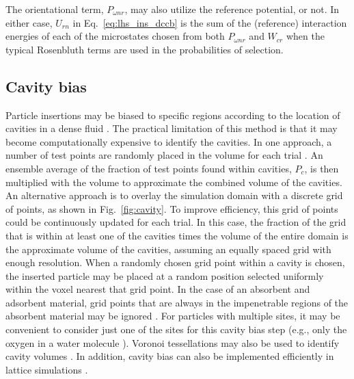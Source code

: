 \documentclass[
  9pt,
  bestpractices,
]{livecoms}
\begin{document}
The orientational term, $P_{\omega nr}$, may also utilize the reference potential, or not.
In either case, $U_{rn}$ in Eq.~\ref{eq:lhs_ins_dccb} is the sum of the (reference) interaction energies of each of the microstates chosen from both $P_{\omega nr}$ and $W_{cr}$ when the typical Rosenbluth terms are used in the probabilities of selection.

\subsection{\label{sec:lhs_insdel_cavity}Cavity bias}

Particle insertions may be biased to specific regions according to the location of cavities in a dense fluid \cite{mezei_cavity-biased_1980, mezei_grand-canonical_1987, snurr_prediction_1993, ikeda_generalization_2024}.
The practical limitation of this method is that it may become computationally expensive to identify the cavities.
In one approach, a number of test points are randomly placed in the volume for each trial \cite{mezei_cavity-biased_1980, mezei_grand-canonical_1987, snurr_prediction_1993}.
An ensemble average of the fraction of test points found within cavities, $P_c$, is then multiplied with the volume to approximate the combined volume of the cavities.
An alternative approach is to overlay the simulation domain with a discrete grid of points, as shown in Fig.~\ref{fig:cavity}.
To improve efficiency, this grid of points could be continuously updated for each trial.
In this case, the fraction of the grid that is within at least one of the cavities times the volume of the entire domain is the approximate volume of the cavities, assuming an equally spaced grid with enough resolution.
When a randomly chosen grid point within a cavity is chosen, the inserted particle may be placed at a random position selected uniformly within the voxel nearest that grid point.
In the case of an absorbent and adsorbent material, grid points that are always in the impenetrable regions of the absorbent material may be ignored \cite{snurr_prediction_1993}.
For particles with multiple sites, it may be convenient to consider just one of the sites for this cavity bias step (e.g., only the oxygen in a water molecule \cite{zhang_computational_2017}).
Voronoi tessellations may also be used to identify cavity volumes \cite{sastry_statistical_1997}.
In addition, cavity bias can also be implemented efficiently in lattice simulations \cite{barnes_structure_2009}.
\end{document}
